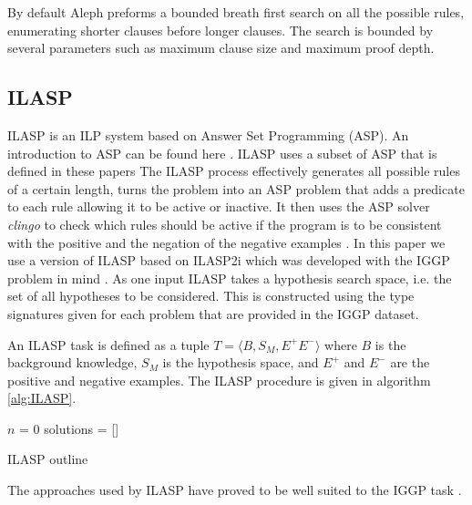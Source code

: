 By default Aleph preforms a bounded breath first search on all the possible rules, enumerating shorter clauses before longer clauses. The search is bounded by several parameters such as maximum clause size and maximum proof depth.

\subsection{ILASP}

ILASP is an ILP system based on Answer Set Programming (ASP). An introduction to ASP can be found here  \cite{Corapi/ASP}. ILASP uses a subset of ASP that is defined in these papers  \cite{ILASP-Manuel,MarkLaw/OG-ILASP,MarkLaw/Thesis} The ILASP process effectively generates all possible rules of a certain length, turns the problem into an ASP problem that adds a predicate to each rule allowing it to be active or inactive. It then uses the ASP solver \textit{clingo}  \cite{Clingo}  to check which rules should be active if the program is to be consistent with the positive and the negation of the negative examples  \cite{MarkLaw/OG-ILASP,MarkLaw/Thesis}. In this paper we use a version of ILASP based on ILASP2i  \cite{MarkLaw/ILASP2i} which was developed with the IGGP problem in mind \cite{Cropper/IGGP}. As one input ILASP takes a hypothesis search space, i.e. the set of all hypotheses to be considered. This is constructed using the type signatures given for each problem that are provided in the IGGP dataset.

An ILASP task is defined as a tuple $T = \langle B,S_M,E^+E^-\rangle$ where $B$ is the background knowledge, $S_M$ is the hypothesis space, and $E^+$ and $E^-$ are the positive and negative examples. The ILASP procedure is given in algorithm \ref{alg:ILASP}.
\begin{algorithm}[H]\label{alg:ILASP}
    \SetAlgoLined
    $n$ = 0\;
    solutions = []\;
    \caption{ILASP outline}
\end{algorithm}

The approaches used by ILASP have proved to be well suited to the IGGP task  \cite{Cropper/IGGP}.